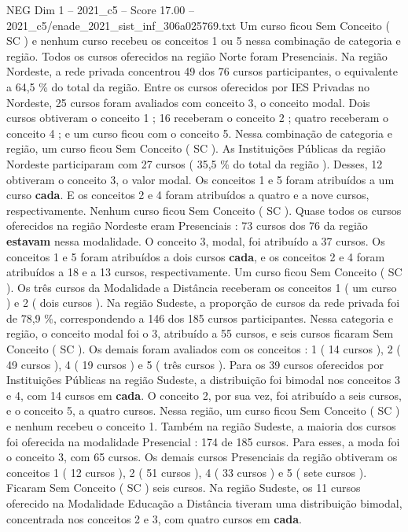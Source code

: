\begin{textsample}{NEG Dim 1 – 2021\_c5 – Score 17.00 – 2021\_c5/enade\_2021\_sist\_inf\_306a025769.txt}
Um curso ficou Sem Conceito ( SC ) e nenhum curso recebeu os conceitos 1 ou 5 nessa combinação de categoria e região.
Todos os cursos oferecidos na região Norte foram Presenciais.
Na região Nordeste, a rede privada concentrou 49 dos 76 cursos participantes, o equivalente a 64,5 \% do total da região.
Entre os cursos oferecidos por IES Privadas no Nordeste, 25 cursos foram avaliados com conceito 3, o conceito modal.
Dois cursos obtiveram o conceito 1 ; 16 receberam o conceito 2 ; quatro receberam o conceito 4 ; e um curso ficou com o conceito 5.
Nessa combinação de categoria e região, um curso ficou Sem Conceito ( SC ).
As Instituições Públicas da região Nordeste participaram com 27 cursos ( 35,5 \% do total da região ).
Desses, 12 obtiveram o conceito 3, o valor modal.
Os conceitos 1 e 5 foram atribuídos a um curso \textbf{cada}.
E os conceitos 2 e 4 foram atribuídos a quatro e a nove cursos, respectivamente.
Nenhum curso ficou Sem Conceito ( SC ).
Quase todos os cursos oferecidos na região Nordeste eram Presenciais : 73 cursos dos 76 da região \textbf{estavam} nessa modalidade.
O conceito 3, modal, foi atribuído a 37 cursos.
Os conceitos 1 e 5 foram atribuídos a dois cursos \textbf{cada}, e os conceitos 2 e 4 foram atribuídos a 18 e a 13 cursos, respectivamente.
Um curso ficou Sem Conceito ( SC ).
Os três cursos da Modalidade a Distância receberam os conceitos 1 ( um curso ) e 2 ( dois cursos ).
Na região Sudeste, a proporção de cursos da rede privada foi de 78,9 \%, correspondendo a 146 dos 185 cursos participantes.
Nessa categoria e região, o conceito modal foi o 3, atribuído a 55 cursos, e seis cursos ficaram Sem Conceito ( SC ).
Os demais foram avaliados com os conceitos : 1 ( 14 cursos ), 2 ( 49 cursos ), 4 ( 19 cursos ) e 5 ( três cursos ).
Para os 39 cursos oferecidos por Instituições Públicas na região Sudeste, a distribuição foi bimodal nos conceitos 3 e 4, com 14 cursos em \textbf{cada}.
O conceito 2, por sua vez, foi atribuído a seis cursos, e o conceito 5, a quatro cursos.
Nessa região, um curso ficou Sem Conceito ( SC ) e nenhum recebeu o conceito 1.
Também na região Sudeste, a maioria dos cursos foi oferecida na modalidade Presencial : 174 de 185 cursos.
Para esses, a moda foi o conceito 3, com 65 cursos.
Os demais cursos Presenciais da região obtiveram os conceitos 1 ( 12 cursos ), 2 ( 51 cursos ), 4 ( 33 cursos ) e 5 ( sete cursos ).
Ficaram Sem Conceito ( SC ) seis cursos.
Na região Sudeste, os 11 cursos oferecido na Modalidade Educação a Distância tiveram uma distribuição bimodal, concentrada nos conceitos 2 e 3, com quatro cursos em \textbf{cada}.

\end{textsample}
